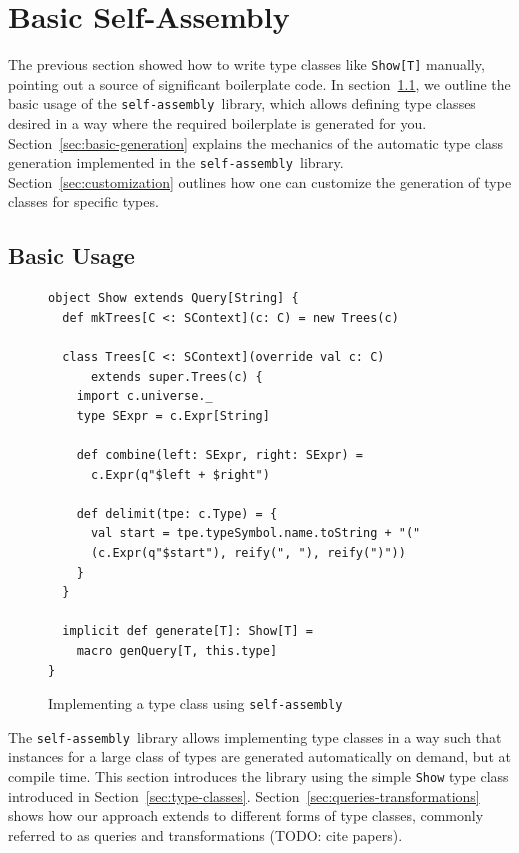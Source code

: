 \documentclass[preprint,nocopyrightspace]{sigplanconf}
\newcommand{\selfassembly}{\texttt{self-assembly~}}
\begin{document}
\section{Basic Self-Assembly}
\label{sec:basic-self-assembly}


The previous section showed how to write type classes like \verb|Show[T]|
manually, pointing out a source of significant boilerplate code. In
section~\ref{sec:basic-usage}, we outline the basic usage of the
\selfassembly library, which allows defining type classes desired in a way
where the required boilerplate is generated for you.
Section~\ref{sec:basic-generation} explains the mechanics of the automatic
type class generation implemented in the \selfassembly library.
Section~\ref{sec:customization} outlines how one can customize the generation
of type classes for specific types.

\subsection{Basic Usage}
\label{sec:basic-usage}

\begin{figure}
\centering
\begin{lstlisting}
object Show extends Query[String] {
  def mkTrees[C <: SContext](c: C) = new Trees(c)

  class Trees[C <: SContext](override val c: C)
      extends super.Trees(c) {
    import c.universe._
    type SExpr = c.Expr[String]

    def combine(left: SExpr, right: SExpr) =
      c.Expr(q"$left + $right")

    def delimit(tpe: c.Type) = {
      val start = tpe.typeSymbol.name.toString + "("
      (c.Expr(q"$start"), reify(", "), reify(")"))
    }
  }

  implicit def generate[T]: Show[T] =
    macro genQuery[T, this.type]
}
\end{lstlisting}
  \caption{Implementing a type class using \selfassembly}
  \label{fig:basic-usage}
\end{figure}

The \selfassembly library allows implementing type classes in a way such that
instances for a large class of types are generated automatically on demand, but at compile time.
This section introduces the library using the simple \verb|Show| type class
introduced in Section~\ref{sec:type-classes}. Section~\ref{sec:queries-transformations}
shows how our approach extends to different forms of type classes, commonly referred to
as queries and transformations (TODO: cite papers).
\end{document}
